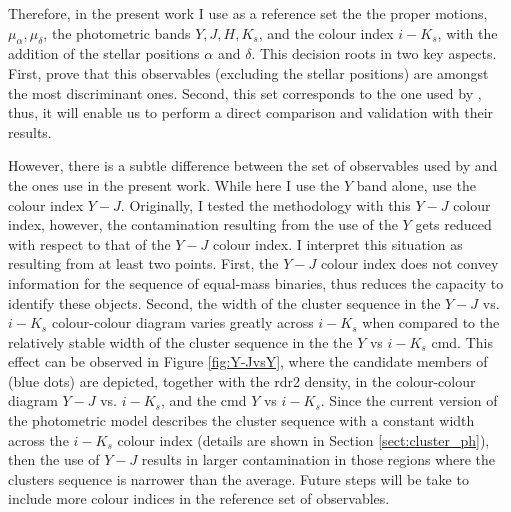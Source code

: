 Therefore, in the present work I use as a reference set the the proper motions, $\mu_{\alpha},\mu_{\delta}$, the photometric bands $Y,J,H,K_s$, and the colour index $i-K_s$, with the addition of the stellar positions  $\alpha$ and $\delta$. This decision roots in two key aspects. First,  \citet{Sarro2014} prove that this observables (excluding the stellar positions) are amongst the most discriminant ones. Second, this set corresponds to the one used by \cite{Bouy2015}, thus, it will enable us to perform a direct comparison and validation with their results. 

However, there is a subtle difference between the set of observables used by \cite{Bouy2015} and the ones use in the present work. While here I use the $Y$ band alone, \citet{Bouy2015} use the colour index $Y-J$. Originally, I tested the methodology with this $Y-J$ colour index, however, the contamination resulting from the use of the $Y$ gets reduced with respect to that of the $Y-J$ colour index. I interpret this situation as resulting from at least two points. First, the $Y-J$ colour index does not convey information for the sequence of equal-mass binaries, thus reduces the capacity to identify these objects. Second, the width of the cluster sequence in the $Y-J$ vs. $i-K_s$ colour-colour diagram varies greatly across $i-K_s$ when compared to the relatively stable width of the cluster sequence in the the $Y$ vs $i-K_s$ \gls{cmd}. This effect can be observed in Figure \ref{fig:Y-JvsY}, where the candidate members of \citet{Bouy2015} (blue dots) are depicted, together with the \gls{rdr2} density, in the colour-colour diagram $Y-J$ vs. $i-K_s$, and the  \gls{cmd} $Y$ vs $i-K_s$. Since the current version of the photometric model describes the cluster sequence with a constant width across the $i-K_s$ colour index (details are shown in Section \ref{sect:cluster_ph}), then the use of $Y-J$ results in larger contamination in those regions where the clusters sequence is narrower than the average. Future steps will be take to include more colour indices in the reference set of observables.

